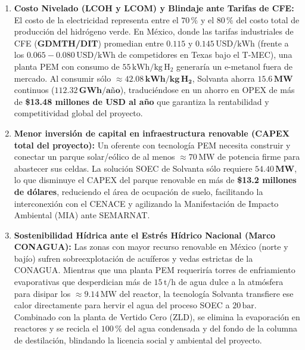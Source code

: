 \documentclass[11pt,a4paper]{article}
\begin{document}
\begin{enumerate}
    \item \textbf{Costo Nivelado (LCOH y LCOM) y Blindaje ante Tarifas de CFE:}  
    El costo de la electricidad representa entre el $70\,\%$ y el $80\,\%$ del costo total de producción del hidrógeno verde. En México, donde las tarifas industriales de CFE (\textbf{GDMTH/DIT}) promedian entre $0.115\text{ y }0.145\,\text{USD/kWh}$ (frente a los $0.065 - 0.080\,\text{USD/kWh}$ de competidores en Texas bajo el T-MEC), una planta PEM con consumo de $55\,\text{kWh/kg}\,\text{H}_2$ generaría un e-metanol fuera de mercado. Al consumir sólo $\approx \mathbf{42.08\,\text{kWh/kg}\,\text{H}_2}$, Solvanta ahorra $\mathbf{15.6\,\text{MW}}$ continuos ($\mathbf{112.32\,\text{GWh/año}}$), traduciéndose en un ahorro en OPEX de más de \textbf{\$13.48 millones de USD al año} que garantiza la rentabilidad y competitividad global del proyecto.
    
    \item \textbf{Menor inversión de capital en infraestructura renovable (CAPEX total del proyecto):}  
    Un oferente con tecnología PEM necesita construir y conectar un parque solar/eólico de al menos $\approx 70\,\text{MW}$ de potencia firme para abastecer sus celdas. La solución SOEC de Solvanta sólo requiere $\mathbf{54.40\,\text{MW}}$, lo que disminuye el CAPEX del parque renovable en más de \textbf{\$13.2 millones de dólares}, reduciendo el área de ocupación de suelo, facilitando la interconexión con el CENACE y agilizando la Manifestación de Impacto Ambiental (MIA) ante SEMARNAT.
    
    \item \textbf{Sostenibilidad Hídrica ante el Estrés Hídrico Nacional (Marco CONAGUA):}  
    Las zonas con mayor recurso renovable en México (norte y bajío) sufren sobreexplotación de acuíferos y vedas estrictas de la CONAGUA. Mientras que una planta PEM requeriría torres de enfriamiento evaporativas que desperdician más de $15\,\text{t/h}$ de agua dulce a la atmósfera para disipar los $\approx 9.14\,\text{MW}$ del reactor, la tecnología Solvanta transfiere ese calor directamente para hervir el agua del proceso SOEC a $20\,\text{bar}$. Combinado con la planta de Vertido Cero (ZLD), se elimina la evaporación en reactores y se recicla el $100\,\%$ del agua condensada y del fondo de la columna de destilación, blindando la licencia social y ambiental del proyecto.
\end{enumerate}
\end{document}
